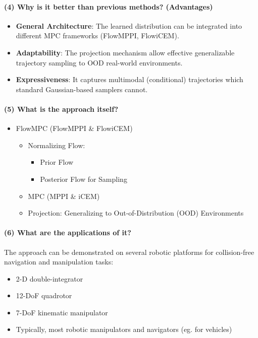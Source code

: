 \documentclass{article}
\begin{document}
\paragraph{(4) Why is it better than previous methods? (Advantages)} 
\begin{itemize}
  \item \textbf{General Architecture}: The learned distribution can be integrated into different MPC frameworks (FlowMPPI, FlowiCEM).
  \item \textbf{Adaptability}: The projection mechanism allow effective generalizable trajectory sampling to OOD real-world environments.
  \item \textbf{Expressiveness}: It captures multimodal (conditional) trajectories which standard Gaussian-based samplers cannot.
\end{itemize}

\paragraph{(5) What is the approach itself?} 
\begin{itemize}
  \item FlowMPC (FlowMPPI \& FlowiCEM)
  \begin{itemize}
    \item Normalizing Flow:
      \begin{itemize}
        \item Prior Flow
        \item Posterior Flow for Sampling
      \end{itemize}
    \item MPC (MPPI \& iCEM)
    \item Projection: Generalizing to Out-of-Distribution (OOD) Environments
  \end{itemize}
\end{itemize}

\paragraph{(6) What are the applications of it?} 
The approach can be demonstrated on several robotic platforms for collision-free navigation and manipulation tasks:
\begin{itemize}
  \item 2-D double-integrator
  \item 12-DoF quadrotor
  \item 7-DoF kinematic manipulator
  \item Typically, most robotic manipulators and navigators (eg. for vehicles)
\end{itemize}
\end{document}
